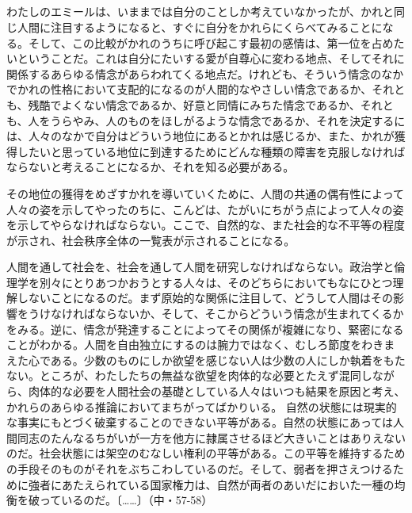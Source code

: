 \subsection{}



わたしのエミールは、いままでは自分のことしか考えていなかったが、かれと同じ人間に注目するようになると、すぐに自分をかれらにくらべてみることになる。そして、この比較がかれのうちに呼び起こす最初の感情は、第一位を占めたいということだ。これは自分にたいする愛が自尊心に変わる地点、そしてそれに関係するあらゆる情念があらわれてくる地点だ。けれども、そういう情念のなかでかれの性格において支配的になるのが人間的なやさしい情念であるか、それとも、残酷でよくない情念であるか、好意と同情にみちた情念であるか、それとも、人をうらやみ、人のものをほしがるような情念であるか、それを決定するには、人々のなかで自分はどういう地位にあるとかれは感じるか、また、かれが獲得したいと思っている地位に到達するためにどんな種類の障害を克服しなければならないと考えることになるか、それを知る必要がある。

その地位の獲得をめざすかれを導いていくために、人間の共通の偶有性によって人々の姿を示してやったのちに、こんどは、たがいにちがう点によって人々の姿を示してやらなければならない。ここで、自然的な、また社会的な不平等の程度が示され、社会秩序全体の一覧表が示されることになる。

人間を通して社会を、社会を通して人間を研究しなければならない。政治学と倫理学を別々にとりあつかおうとする人々は、そのどちらにおいてもなにひとつ理解しないことになるのだ。まず原始的な関係に注目して、どうして人間はその影響をうけなければならないか、そして、そこからどういう情念が生まれてくるかをみる。逆に、情念が発達することによってその関係が複雑になり、緊密になることがわかる。人間を自由独立にするのは腕力ではなく、むしろ節度をわきまえた心である。少数のものにしか欲望を感じない人は少数の人にしか執着をもたない。ところが、わたしたちの無益な欲望を肉体的な必要とたえず混同しながら、肉体的な必要を人間社会の基礎としている人々はいつも結果を原因と考え、かれらのあらゆる推論においてまちがってばかりいる。
自然の状態には現実的な事実にもとづく破棄することのできない平等がある。自然の状態にあっては人間同志のたんなるちがいが一方を他方に隷属させるほど大きいことはありえないのだ。社会状態には架空のむなしい権利の平等がある。この平等を維持するための手段そのものがそれをぶちこわしているのだ。そして、弱者を押さえつけるために強者にあたえられている国家権力は、自然が両者のあいだにおいた一種の均衡を破っているのだ。〔……〕（中・57-58）

\subsection{}



